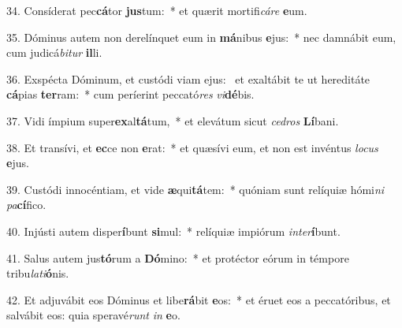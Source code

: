 34. Consíderat pec\textbf{cá}tor \textbf{jus}tum:~*  et quærit mortifi\textit{cá}\textit{re} \textbf{e}um.\

35. Dóminus autem non derelínquet eum in \textbf{má}nibus \textbf{e}jus:~*  nec damnábit eum, cum judicá\textit{bi}\textit{tur} \textbf{il}li.\

36. Exspécta Dóminum, et custódi viam ejus: \dag\  et exaltábit te ut hereditáte \textbf{cá}pias \textbf{ter}ram:~*  cum períerint peccató\textit{res} \textit{vi}\textbf{dé}bis.\

37. Vidi ímpium super\textbf{ex}al\textbf{tá}tum,~*  et elevátum sicut \textit{ce}\textit{dros} \textbf{Lí}bani.\

38. Et transívi, et \textbf{ec}ce non \textbf{e}rat:~*  et quæsívi eum, et non est invéntus \textit{lo}\textit{cus} \textbf{e}jus.\

39. Custódi innocéntiam, et vide \textbf{æ}qui\textbf{tá}tem:~*  quóniam sunt relíquiæ hómi\textit{ni} \textit{pa}\textbf{cí}fico.\

40. Injústi autem disper\textbf{í}bunt \textbf{si}mul:~*  relíquiæ impiórum \textit{in}\textit{ter}\textbf{í}bunt.\

41. Salus autem jus\textbf{tó}rum a \textbf{Dó}mino:~*  et protéctor eórum in témpore tribu\textit{la}\textit{ti}\textbf{ó}nis.\

42. Et adjuvábit eos Dóminus et libe\textbf{rá}bit \textbf{e}os:~*  et éruet eos a peccatóribus, et salvábit eos: quia speravé\textit{runt} \textit{in} \textbf{e}o.\

